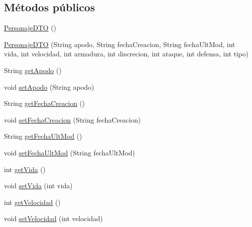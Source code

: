 \subsection*{Métodos públicos}
\begin{DoxyCompactItemize}
\item 
\hyperlink{classes_1_1deusto_1_1spq_1_1_t_e_scc_1_1dto_1_1_personaje_d_t_o_a9c517aebb849cee3b383d77081652a4c}{Personaje\+D\+T\+O} ()
\item 
\hyperlink{classes_1_1deusto_1_1spq_1_1_t_e_scc_1_1dto_1_1_personaje_d_t_o_ae51a544e15ea8c8abf56f3cea563a827}{Personaje\+D\+T\+O} (String apodo, String fecha\+Creacion, String fecha\+Ult\+Mod, int vida, int velocidad, int armadura, int discrecion, int ataque, int defensa, int tipo)
\item 
String \hyperlink{classes_1_1deusto_1_1spq_1_1_t_e_scc_1_1dto_1_1_personaje_d_t_o_ae081733256f0efb2ff82fa30b0ce1e45}{get\+Apodo} ()
\item 
void \hyperlink{classes_1_1deusto_1_1spq_1_1_t_e_scc_1_1dto_1_1_personaje_d_t_o_a3d95956ca98cf9b74277968bdfc15327}{set\+Apodo} (String apodo)
\item 
String \hyperlink{classes_1_1deusto_1_1spq_1_1_t_e_scc_1_1dto_1_1_personaje_d_t_o_a342ea2ad7bab7c5457d97375fe95add5}{get\+Fecha\+Creacion} ()
\item 
void \hyperlink{classes_1_1deusto_1_1spq_1_1_t_e_scc_1_1dto_1_1_personaje_d_t_o_a3b77e6c57f655eca360ef89416b0e94d}{set\+Fecha\+Creacion} (String fecha\+Creacion)
\item 
String \hyperlink{classes_1_1deusto_1_1spq_1_1_t_e_scc_1_1dto_1_1_personaje_d_t_o_a51663f9d4c417d2c0432e2d46eb72ab5}{get\+Fecha\+Ult\+Mod} ()
\item 
void \hyperlink{classes_1_1deusto_1_1spq_1_1_t_e_scc_1_1dto_1_1_personaje_d_t_o_adf2388cce299820653977b47c90519d1}{set\+Fecha\+Ult\+Mod} (String fecha\+Ult\+Mod)
\item 
int \hyperlink{classes_1_1deusto_1_1spq_1_1_t_e_scc_1_1dto_1_1_personaje_d_t_o_a3be157d1ea24525ec0a307cc507baa14}{get\+Vida} ()
\item 
void \hyperlink{classes_1_1deusto_1_1spq_1_1_t_e_scc_1_1dto_1_1_personaje_d_t_o_a64573bace7226b38523ef24de53de842}{set\+Vida} (int vida)
\item 
int \hyperlink{classes_1_1deusto_1_1spq_1_1_t_e_scc_1_1dto_1_1_personaje_d_t_o_ae7ed2ed66e12d3ef42a0cd670b777203}{get\+Velocidad} ()
\item 
void \hyperlink{classes_1_1deusto_1_1spq_1_1_t_e_scc_1_1dto_1_1_personaje_d_t_o_ab02bc4dc92c6f3c2ad1f6425fd819af2}{set\+Velocidad} (int velocidad)

\end{DoxyCompactItemize}
